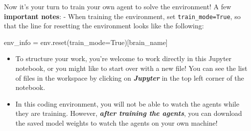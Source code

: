 \documentclass[11pt]{article}
\providecommand{\tightlist}{%
      \setlength{\itemsep}{0pt}\setlength{\parskip}{0pt}}
\newenvironment{Shaded}{}{}
\newcommand{\NormalTok}[1]{{#1}}
\newcommand{\VariableTok}[1]{\textcolor[rgb]{0.10,0.09,0.49}{{#1}}}
\newcommand{\OperatorTok}[1]{\textcolor[rgb]{0.40,0.40,0.40}{{#1}}}
\begin{document}
Now it's your turn to train your own agent to solve the environment! A
few \textbf{important notes}: - When training the environment, set
\texttt{train\_mode=True}, so that the line for resetting the
environment looks like the following:

\begin{Shaded}
\begin{Highlighting}[]
\NormalTok{env_info }\OperatorTok{=}\NormalTok{ env.reset(train_mode}\OperatorTok{=}\VariableTok{True}\NormalTok{)[brain_name]}
\end{Highlighting}
\end{Shaded}

\begin{itemize}
\tightlist
\item
  To structure your work, you're welcome to work directly in this
  Jupyter notebook, or you might like to start over with a new file! You
  can see the list of files in the workspace by clicking on
  \textbf{\emph{Jupyter}} in the top left corner of the notebook.
\item
  In this coding environment, you will not be able to watch the agents
  while they are training. However, \textbf{\emph{after training the
  agents}}, you can download the saved model weights to watch the agents
  on your own machine!
\end{itemize}


    
    
    
    
\end{document}
